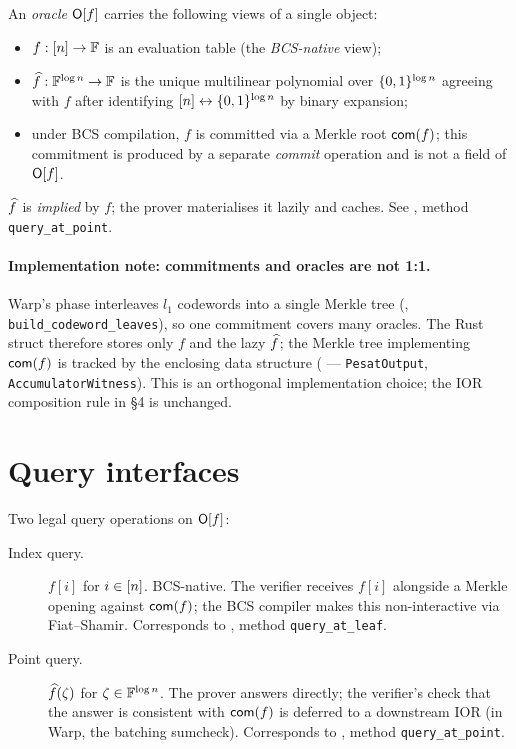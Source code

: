 \documentclass{article}
\begin{document}
An \emph{oracle} \(\mathsf{O}[f]\) carries the following views of a single
object:
\begin{itemize}
  \item \(f : [n] \to \mathbb{F}\) is an evaluation table (the \emph{BCS-native}
        view);
  \item \(\widehat{f} : \mathbb{F}^{\log n} \to \mathbb{F}\) is the unique multilinear polynomial
        over \(\{0,1\}^{\log n}\) agreeing with \(f\) after identifying
        \([n] \leftrightarrow \{0,1\}^{\log n}\) by binary expansion;
  \item under BCS compilation, \(f\) is committed via a Merkle root
        \(\mathsf{com}(f)\); this commitment is produced by a separate
        \emph{commit} operation and is not a field of \(\mathsf{O}[f]\).
\end{itemize}

\(\widehat{f}\) is \emph{implied} by \(f\); the prover materialises it lazily and
caches. See , method \texttt{query\_at\_point}.

\paragraph{Implementation note: commitments and oracles are not 1:1.} Warp's
\Pesat{} phase interleaves \(l_1\) codewords into a single Merkle tree
(, \texttt{build\_codeword\_leaves}), so one
commitment covers many oracles. The Rust  struct therefore
stores only \(f\) and the lazy \(\widehat{f}\); the Merkle tree implementing
\(\mathsf{com}(f)\) is tracked by the enclosing data structure
( --- \texttt{PesatOutput}, \texttt{AccumulatorWitness}).
This is an orthogonal implementation choice; the IOR composition rule in
\S4 is unchanged.

\section{Query interfaces}

Two legal query operations on \(\mathsf{O}[f]\):

\begin{description}
  \item[Index query.] \(f[i]\) for \(i \in [n]\). BCS-native.
        The verifier receives \(f[i]\) alongside a Merkle opening against
        \(\mathsf{com}(f)\); the BCS compiler makes this non-interactive via
        Fiat--Shamir. Corresponds to
        , method \texttt{query\_at\_leaf}.
  \item[Point query.] \(\widehat{f}(\zeta)\) for \(\zeta \in \mathbb{F}^{\log n}\).
        The prover answers directly; the verifier's check that the answer is
        consistent with \(\mathsf{com}(f)\) is deferred to a downstream IOR (in
        Warp, the batching sumcheck). Corresponds to
        , method \texttt{query\_at\_point}.
\end{description}
\end{document}
